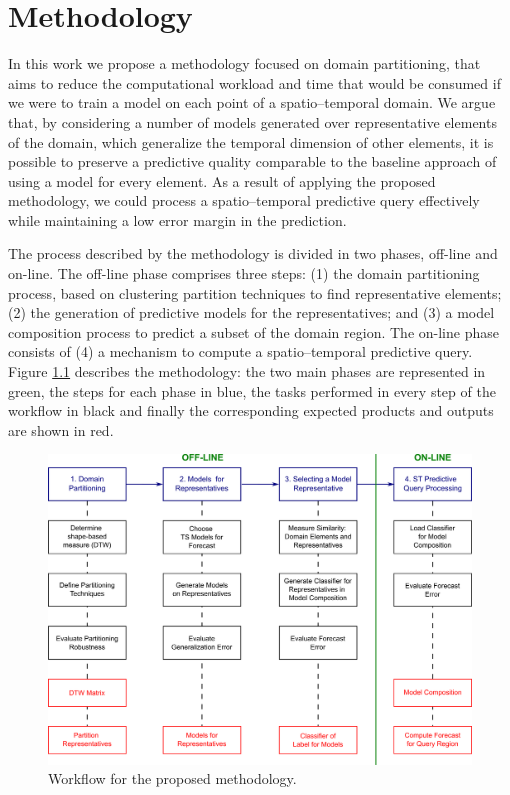 \chapter[Methodology]{Methodology}
\label{Chapter:Methodology}

In this work we propose a methodology focused on domain partitioning, that aims to reduce the computational workload and time that would be consumed if we were to train a model on each point of a spatio--temporal domain. We argue that, by considering a number of models generated over representative elements of the domain, which generalize the temporal dimension of other elements, it is possible to preserve a predictive quality comparable to the baseline approach of using a model for every element. As a result of applying the proposed methodology, we could process a spatio--temporal predictive query effectively while maintaining a low error margin in the prediction.

The process described by the methodology is divided in two phases, off-line and on-line. The off-line phase comprises three steps: (1) the domain partitioning process, based on clustering partition techniques to find representative elements; (2) the generation of predictive models for the representatives; and (3) a model composition process to predict a subset of the domain region. The on-line phase consists of (4) a mechanism to compute a spatio--temporal predictive query. Figure \ref{Fig:OverviewMethodology} describes the methodology: the two main phases are represented in green, the steps for each phase in blue, the tasks performed in every step of the workflow in black and finally the corresponding expected products and outputs are shown in red. 

\begin{figure}[h]
	\centering
	\includegraphics[scale=0.14]{../Figures/Methodology_Complete}
	\caption{Workflow for the proposed methodology.}
	\label{Fig:OverviewMethodology}
\end{figure}

